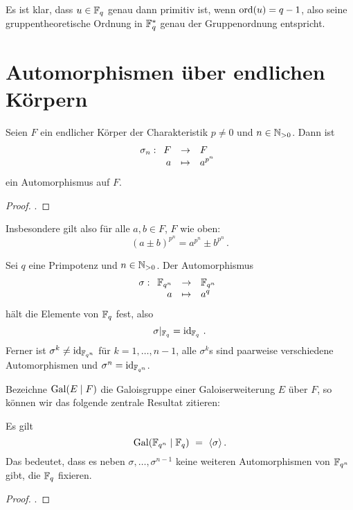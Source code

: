 \begin{bemerkung}
  Es ist klar, dass $u\in \mathbb{F}_q$ genau dann primitiv ist, wenn 
  $\operatorname{ord}(u) = q-1$, also seine gruppentheoretische Ordnung in $\mathbb{F}_q^\ast$ genau
  der Gruppenordnung entspricht.
\end{bemerkung}


\section{Automorphismen über endlichen Körpern}

\begin{satz}
  \label{satz:frob_auto}
  Seien $F$ ein endlicher Körper der Charakteristik $p\neq 0$ und 
  $n\in \mathbb{N}_{>0}$. Dann ist
  \[ \sigma_n: \funcdef{F &\to& F\\
    a &\mapsto& a^{p^n}}\]
  ein Automorphismus auf $F$.
\end{satz}
\begin{proof}
  \autocite[Corollary 3.18]{wan2003lectures}.
\end{proof}

\begin{bemerkung}
  Insbesondere gilt also für alle $a,b\in F$, $F$ wie oben:
  \[ (a\pm b)^{p^n} = a^{p^n} \pm b^{p^n}\,.\]
\end{bemerkung}

\begin{satz}
  \label{satz:frob_fix}
  Sei $q$ eine Primpotenz und $n\in \mathbb{N}_{>0}$. Der Automorphismus
  \[ \sigma: \funcdef{\F_{q^n} &\to& \F_{q^n}\\
    a &\mapsto& a^q}\]
  hält die Elemente von $\mathbb{F}_q$ fest, also 
  \[ \sigma |_{\mathbb{F}_q} = \operatorname{id}_{\mathbb{F}_q}\,.\]
  Ferner ist $\sigma^k \neq \operatorname{id}_{\mathbb{F}_{q^n}}$ für $k=1,\ldots,n-1$, alle
  $\sigma^k$s sind paarweise verschiedene Automorphismen und 
  $\sigma^n = \operatorname{id}_{\mathbb{F}_{q^n}}$.
\end{satz}


Bezeichne $\operatorname{Gal}(E \mid F)$ die Galoisgruppe einer Galoiserweiterung $E$ über
$F$, so können wir das folgende zentrale Resultat zitieren:

\begin{satz}
  \label{satz:frob_sind_alle_autos}
  Es gilt
  \[ \operatorname{Gal}(\mathbb{F}_{q^n}\mid \mathbb{F}_q) \ =\  \langle \sigma\rangle\,.\]
  Das bedeutet, dass es neben $\sigma,\ldots,\sigma^{n-1}$ keine weiteren
  Automorphismen von $\mathbb{F}_{q^n}$ gibt, die $\mathbb{F}_q$ fixieren.
\end{satz}
\begin{proof}
  \autocite[Theorem 7.3]{wan2003lectures}.
\end{proof}

